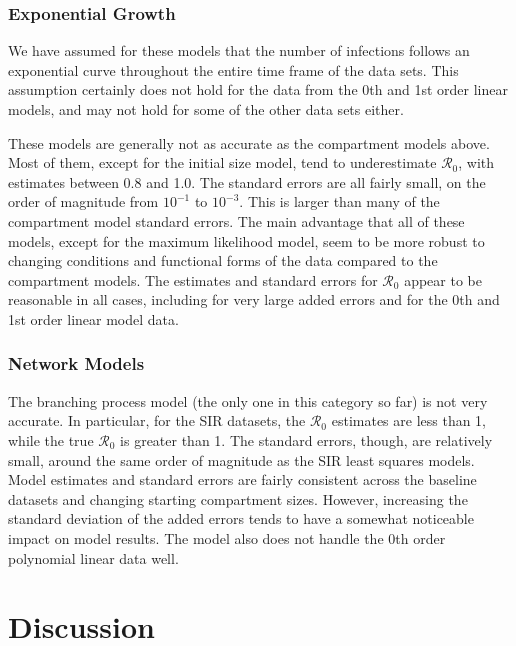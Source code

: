 \documentclass[12pt]{article}
\newcommand{\rr}{\ensuremath{\mathcal{R}_0}}
\begin{document}
\subsubsection{Exponential Growth}

We have assumed for these models that the number of infections follows an exponential curve throughout the entire time frame of the data sets. This assumption certainly does not hold for the data from the 0th and 1st order linear models, and may not hold for some of the other data sets either. 

These models are generally not as accurate as the compartment models above. Most of them, except for the initial size model, tend to underestimate $\rr$, with estimates between 0.8 and 1.0. The standard errors are all fairly small, on the order of magnitude from $10^{-1}$ to $10^{-3}$. This is larger than many of the compartment model standard errors. The main advantage that all of these models, except for the maximum likelihood model, seem to be more robust to changing conditions and functional forms of the data compared to the compartment models. The estimates and standard errors for $\rr$ appear to be reasonable in all cases, including for very large added errors and for the 0th and 1st order linear model data.

\subsubsection{Network Models}

The branching process model (the only one in this category so far) is not very accurate. In particular, for the SIR datasets, the $\rr$ estimates are less than 1, while the true $\rr$ is greater than 1. The standard errors, though, are relatively small, around the same order of magnitude as the SIR least squares models. Model estimates and standard errors are fairly consistent across the baseline datasets and changing starting compartment sizes. However, increasing the standard deviation of the added errors tends to have a somewhat noticeable impact on model results. The model also does not handle the 0th order polynomial linear data well.


\section{Discussion}
\label{sec:dis}


\end{document}
